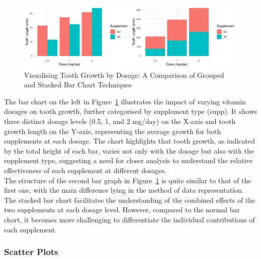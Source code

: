 \documentclass{article}\usepackage[]{graphicx}\usepackage[]{xcolor}
\makeatletter
\def\maxwidth{ %
  \ifdim\Gin@nat@width>\linewidth
    \linewidth
  \else
    \Gin@nat@width
  \fi
}
\newenvironment{knitrout}{}{} %
\makeatother
\begin{document}
\begin{knitrout}\scriptsize
{}\color{fgcolor}\begin{figure}[H]

{\centering \includegraphics[width=\maxwidth]{figure/beamer-barcharts-1} 

}

\caption[Visualising Tooth Growth by Dosage]{Visualising Tooth Growth by Dosage: A Comparison of Grouped and Stacked Bar Chart Techniques}\label{fig:barcharts}
\end{figure}

\end{knitrout}

\noindent 
The bar chart on the left in Figure~\ref{fig:barcharts} illustrates the impact of varying vitamin dosages on tooth growth, further categorised by supplement type (supp). It shows three distinct dosage levels (0.5, 1, and 2 mg/day) on the X-axis and tooth growth length on the Y-axis, representing the average growth for both supplements at each dosage. The chart highlights that tooth growth, as indicated by the total height of each bar, varies not only with the dosage but also with the supplement type, suggesting a need for closer analysis to understand the relative effectiveness of each supplement at different dosages.\\

\noindent
The structure of the second bar graph in Figure~\ref{fig:barcharts} is quite similar to that of the first one, with the main difference lying in the method of data representation. The stacked bar chart facilitates the understanding of the combined effects of the two supplements at each dosage level. However, compared to the normal bar chart, it becomes more challenging to differentiate the individual contributions of each supplement.\\



\subsubsection{Scatter Plots}
\end{document}

